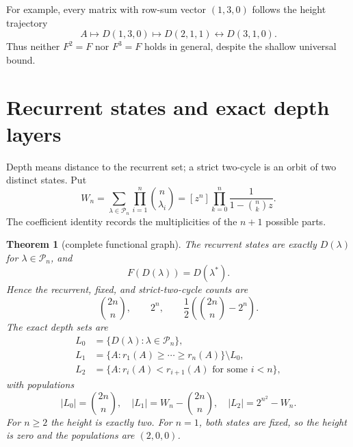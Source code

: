\documentclass[a4paper,10pt]{amsart}
\newtheorem{theorem}{Theorem}
\theoremstyle{remark}
\newcommand{\Pbox}{\mathcal P}
\begin{document}
For example, every matrix with row-sum vector $(1,3,0)$ follows the height
trajectory
\[
 A\longmapsto D(1,3,0)\longmapsto D(2,1,1)
 \longleftrightarrow D(3,1,0).
\]
Thus neither $F^2=F$ nor $F^3=F$ holds in general, despite the shallow
universal bound.

\section{Recurrent states and exact depth layers}

Depth means distance to the recurrent set; a strict two-cycle is an orbit of
two distinct states.  Put
\begin{equation}\label{eq:weighted-partitions}
 W_n=\sum_{\lambda\in\Pbox_n}\prod_{i=1}^n\binom n{\lambda_i}
 =[z^n]\prod_{k=0}^n\frac{1}{1-\binom nk z}.
\end{equation}
The coefficient identity records the multiplicities of the $n+1$ possible
parts.

\begin{theorem}[complete functional graph]\label{thm:functional}
The recurrent states are exactly $D(\lambda)$ for
$\lambda\in\Pbox_n$, and
\begin{equation}\label{eq:recurrent-action}
                 F(D(\lambda))=D(\lambda^*).
\end{equation}
Hence the recurrent, fixed, and strict-two-cycle counts are
\begin{equation}\label{eq:cycle-counts}
 \binom{2n}{n},\qquad 2^n,\qquad
 \frac12\left(\binom{2n}{n}-2^n\right).
\end{equation}
The exact depth sets are
\begin{align*}
 L_0&=\{D(\lambda):\lambda\in\Pbox_n\},\\
 L_1&=\{A:r_1(A)\geq\cdots\geq r_n(A)\}\setminus L_0,\\
 L_2&=\{A:r_i(A)<r_{i+1}(A)\text{ for some }i<n\},
\end{align*}
with populations
\begin{equation}\label{eq:depth-counts}
 |L_0|=\binom{2n}{n},\quad
 |L_1|=W_n-\binom{2n}{n},\quad
 |L_2|=2^{n^2}-W_n.
\end{equation}
For $n\geq2$ the height is exactly two.  For $n=1$, both states are fixed,
so the height is zero and the populations are $(2,0,0)$.
\end{theorem}
\end{document}
